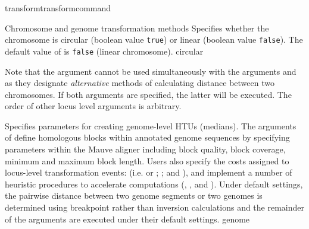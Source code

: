 \begin{command}{transform}{transformcommand}
\begin{arguments}
\begin{argumentgroup}{Chromosome and genome transformation methods}
{Specifies whether the chromosome is circular (boolean value
\texttt{true}) or linear (boolean value \texttt{false}). The
default value of  is \texttt{false}
(linear chromosome).}
{circular}

\begin{statement}
Note that the argument  %
cannot be used simultaneously
with the arguments  and
 as they designate
\emph{alternative} methods of calculating distance between two
chromosomes. If both arguments are specified, the latter will
be executed. The order of other locus level arguments is
arbitrary.
\end{statement}

{Specifies parameters for creating genome-level HTUs (medians). 
The arguments of  define 
homologous blocks within annotated genome sequences by
specifying parameters within the Mauve aligner \cite{darlingetal2004} 
including block quality, block coverage, minimum and maximum block
length. Users also specify the costs assigned to locus-level transformation 
events: (i.e.  or 
; ; and 
), and implement a number of heuristic 
procedures to accelerate computations (, 
, and ). 
Under default settings, the pairwise distance between two genome 
segments or two genomes is determined using breakpoint rather 
than inversion calculations and the remainder of the arguments are executed 
under their default settings.}
{genome}


\end{argumentgroup}
\end{arguments}
\end{command}
